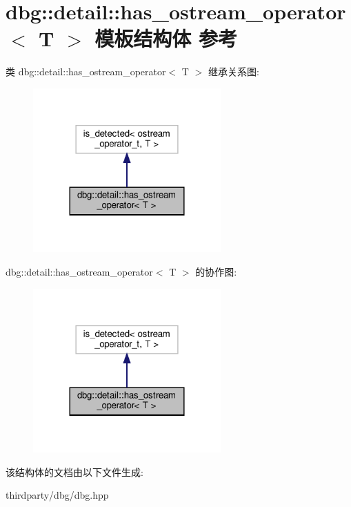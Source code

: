 \hypertarget{structdbg_1_1detail_1_1has__ostream__operator}{}\section{dbg\+:\+:detail\+:\+:has\+\_\+ostream\+\_\+operator$<$ T $>$ 模板结构体 参考}
\label{structdbg_1_1detail_1_1has__ostream__operator}


类 dbg\+:\+:detail\+:\+:has\+\_\+ostream\+\_\+operator$<$ T $>$ 继承关系图\+:\nopagebreak
\begin{figure}[H]
\begin{center}
\leavevmode
\includegraphics[width=204pt]{structdbg_1_1detail_1_1has__ostream__operator__inherit__graph}
\end{center}
\end{figure}


dbg\+:\+:detail\+:\+:has\+\_\+ostream\+\_\+operator$<$ T $>$ 的协作图\+:\nopagebreak
\begin{figure}[H]
\begin{center}
\leavevmode
\includegraphics[width=204pt]{structdbg_1_1detail_1_1has__ostream__operator__coll__graph}
\end{center}
\end{figure}


该结构体的文档由以下文件生成\+:\begin{DoxyCompactItemize}
\item 
thirdparty/dbg/dbg.\+hpp\end{DoxyCompactItemize}
